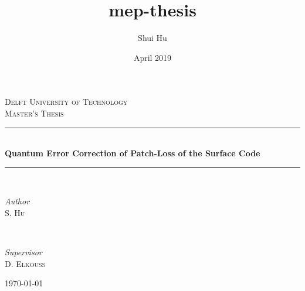 \documentclass[titlepage]{article}
\title{mep-thesis}
\author{Shui Hu}
\date{April 2019}
\begin{document}
\begin{titlepage}
	\newcommand{\HRule}{\rule{\linewidth}{0.3mm}}
	\center

	\textsc{\Large Delft University of Technology}\\[1.5cm]

	\textsc{\large Master's Thesis}\\[0.5cm]

    \vfill

	\HRule\\[1cm]

	{\huge\bfseries Quantum Error Correction of Patch-Loss of the Surface Code}\\[0.4cm]

	\HRule\\[1.8cm]

	\begin{minipage}{0.4\textwidth}
		\begin{flushleft}
			\large
			\textit{Author}\\
			S. \textsc{Hu}
		\end{flushleft}
	\end{minipage}
	~
	\begin{minipage}{0.4\textwidth}
		\begin{flushright}
			\large
			\textit{Supervisor}\\
			D. \textsc{Elkouss} %
		\end{flushright}
	\end{minipage}



	\vfill\vfill\vfill %

	{\large\today} %
	\vfill %

\end{titlepage}










\end{document}

